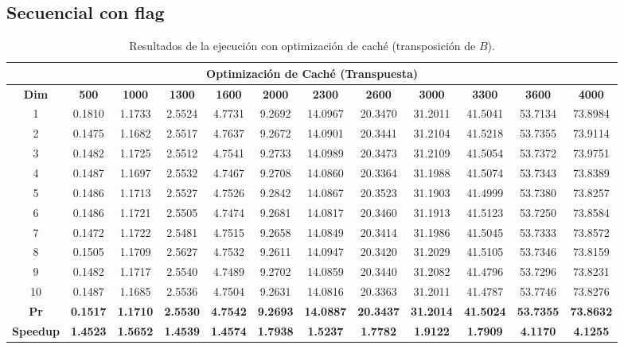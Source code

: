 \documentclass{article}
\begin{document}

\subsection{Secuencial con flag}

\begin{table}[H]
\centering

\tiny
\begin{tabular}{|c|c|c|c|c|c|c|c|c|c|c|c|}
\hline
\multicolumn{12}{|c|}{\textbf{Optimización de Caché (Transpuesta)}} \\
\hline
\textbf{Dim} & \textbf{500} & \textbf{1000} & \textbf{1300} & \textbf{1600} & \textbf{2000} & \textbf{2300} & \textbf{2600} & \textbf{3000} & \textbf{3300} & \textbf{3600} & \textbf{4000} \\
\hline
1  & 0.1810 & 1.1733 & 2.5524 & 4.7731 & 9.2692 & 14.0967 & 20.3470 & 31.2011 & 41.5041 & 53.7134 & 73.8984 \\
2  & 0.1475 & 1.1682 & 2.5517 & 4.7637 & 9.2672 & 14.0901 & 20.3441 & 31.2104 & 41.5218 & 53.7355 & 73.9114 \\
3  & 0.1482 & 1.1725 & 2.5512 & 4.7541 & 9.2733 & 14.0989 & 20.3473 & 31.2109 & 41.5054 & 53.7372 & 73.9751 \\
4  & 0.1487 & 1.1697 & 2.5532 & 4.7467 & 9.2708 & 14.0860 & 20.3364 & 31.1988 & 41.5074 & 53.7343 & 73.8389 \\
5  & 0.1486 & 1.1713 & 2.5527 & 4.7526 & 9.2842 & 14.0867 & 20.3523 & 31.1903 & 41.4999 & 53.7380 & 73.8257 \\
6  & 0.1486 & 1.1721 & 2.5505 & 4.7474 & 9.2681 & 14.0817 & 20.3460 & 31.1913 & 41.5123 & 53.7250 & 73.8584 \\
7  & 0.1472 & 1.1722 & 2.5481 & 4.7515 & 9.2658 & 14.0849 & 20.3414 & 31.1986 & 41.5045 & 53.7333 & 73.8572 \\
8  & 0.1505 & 1.1709 & 2.5627 & 4.7532 & 9.2611 & 14.0947 & 20.3420 & 31.2029 & 41.5105 & 53.7346 & 73.8159 \\
9  & 0.1482 & 1.1717 & 2.5540 & 4.7489 & 9.2702 & 14.0859 & 20.3440 & 31.2082 & 41.4796 & 53.7296 & 73.8231 \\
10 & 0.1487 & 1.1685 & 2.5536 & 4.7504 & 9.2631 & 14.0816 & 20.3363 & 31.2011 & 41.4787 & 53.7746 & 73.8276 \\
\hline
\textbf{Pr} & \textbf{0.1517} & \textbf{1.1710} & \textbf{2.5530} & \textbf{4.7542} & \textbf{9.2693} & \textbf{14.0887} & \textbf{20.3437} & \textbf{31.2014} & \textbf{41.5024} & \textbf{53.7355} & \textbf{73.8632} \\
\hline
\textbf{Speedup} & \textbf{1.4523} & \textbf{1.5652} & \textbf{1.4539} & \textbf{1.4574} & \textbf{1.7938} & \textbf{1.5237} & \textbf{1.7782} & \textbf{1.9122} & \textbf{1.7909} & \textbf{4.1170} & \textbf{4.1255} \\
\hline
\end{tabular}
\label{tab:memoria}
\caption{Resultados de la ejecución con optimización de caché (transposición de $B$).}
\end{table}
\end{document}
